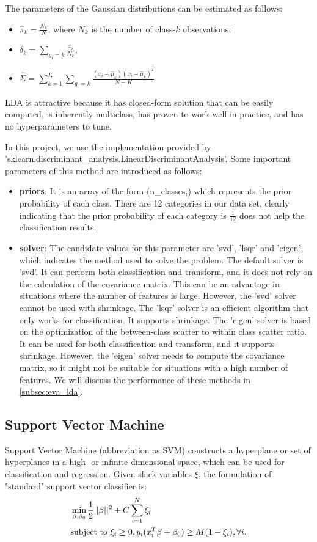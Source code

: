 \documentclass[10pt,journal,compsoc]{IEEEtran}
\begin{document}
The parameters of the Gaussian distributions can be estimated as follows:
\begin{itemize}
  \item $\hat{\pi}_k = \frac{N_k}{N}$, where $N_k$ is the number of class-$k$ observations;
  \item $\hat{\delta}_k = \sum_{g_i=k}\frac{x_i}{N_k}$;
  \item $\hat{\Sigma} = \sum_{k=1}^K\sum_{g_i=k}\frac{(x_i - \hat{\mu}_k)(x_i - \hat{\mu}_k)^T}{N-K}$.
\end{itemize}

LDA is attractive because it has closed-form solution that can be easily computed, is inherently multiclass, has proven to work well in practice, and has no hyperparameters to tune. 

In this project, we use the implementation provided by 'sklearn.discriminant\_analysis.LinearDiscriminantAnalysis'. Some important parameters of this method are introduced as follows:
\begin{itemize}
  \item \textbf{priors}: It is an array of the form (n\_classes,) which represents the prior probability of each class. There are 12 categories in our data set, clearly indicating that the prior probability of each category is $\frac{1}{12}$ does not help the classification results.
  \item \textbf{solver}: The candidate values for this parameter are 'svd', 'lsqr' and 'eigen', which indicates the method used to solve the problem. The default solver is 'svd'. It can perform both classification and transform, and it does not rely on the calculation of the covariance matrix. This can be an advantage in situations where the number of features is large. However, the 'svd' solver cannot be used with shrinkage. The 'lsqr' solver is an efficient algorithm that only works for classification. It supports shrinkage. The 'eigen' solver is based on the optimization of the between-class scatter to within class scatter ratio. It can be used for both classification and transform, and it supports shrinkage. However, the 'eigen' solver needs to compute the covariance matrix, so it might not be suitable for situations with a high number of features. We will discuss the performance of these methods in \ref{subsec:eva_lda}.
\end{itemize}

\subsection{Support Vector Machine}
\label{subsec:support_vector_machine}
Support Vector Machine (abbreviation as SVM) constructs a hyperplane or set of hyperplanes in a high- or infinite-dimensional space, which can be used for classification and regression. Given slack variables $\xi$, the formulation of "standard" support vector classifier is:
\begin{align}
  \label{eq:svm}
  &\min_{\beta, \beta_0}\frac{1}{2}||\beta||^2 + C\sum_{i=1}^N\xi_i \\
  &{\rm subject\ to\ } \xi_i \geq 0, y_i(x_i^T\beta + \beta_0) \geq M(1-\xi_i), \forall i. \notag
\end{align}
\end{document}
